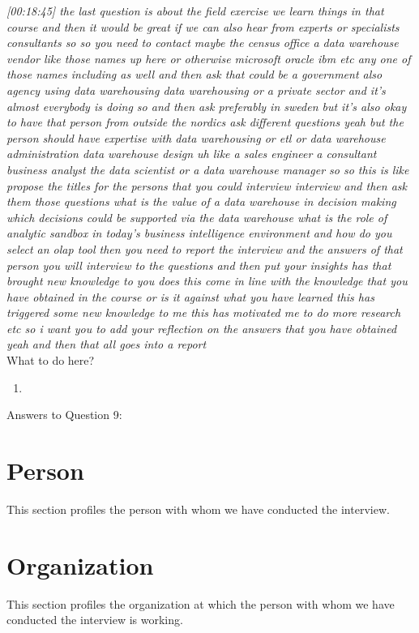 \emph{[00:18:45] the last question is about the field exercise we learn things in that course and then
it would be great if we can also hear from experts or specialists consultants so so you need to contact
maybe the census office a data warehouse vendor like those names up here or otherwise microsoft oracle ibm etc any
one of those names including as well and then ask that could be a government also agency using
data warehousing data warehousing or a private sector and it's almost everybody is doing so and then ask
preferably in sweden but it's also okay to have that person from outside the nordics ask different
questions yeah but the person should have expertise with data warehousing or etl or data warehouse
administration data warehouse design uh like a sales engineer a consultant business analyst the data
scientist or a data warehouse manager so so this is like propose the titles for the persons that you could interview
interview and then ask them those questions what is the value of a data warehouse in decision making
which decisions could be supported via the data warehouse what is the role of analytic sandbox in
today's business intelligence environment and how do you select an olap tool then you need to report
the interview and the answers of that person you will interview to the questions and then put your
insights has that brought new knowledge to you does this come in line with the knowledge that you have
obtained in the course or is it against what you have learned this has triggered some new knowledge to me
this has motivated me to do more research etc so i want you to add your reflection on the answers that
you have obtained yeah and then that all goes into a report}\\

What to do here?
\begin{enumerate}
    \item 
  \end{enumerate}


\newpage Answers to Question 9:
\section{Person}
This section profiles the person with whom we have conducted the interview. 

\section{Organization}
This section profiles the organization at which the person with whom we have conducted the interview is working. 

